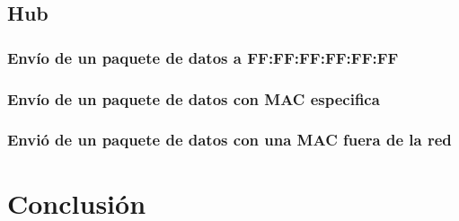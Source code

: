 \documentclass[spanish]{udpreport}
\begin{document}
\newpage


\section{Hub}

\subsection{Envío de un paquete de datos a FF:FF:FF:FF:FF:FF}

\subsection{Envío de un paquete de datos con MAC especifica}

\subsection{Envió de un paquete de datos con una MAC fuera de la red}




\chapter{Conclusión}

\end{document}
